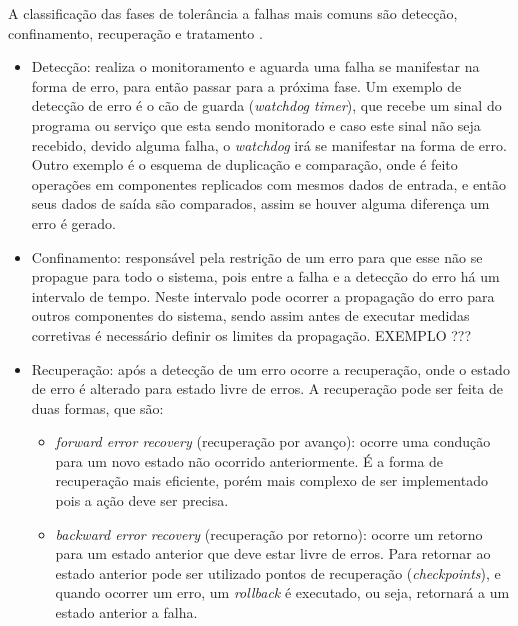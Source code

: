 A classificação das fases de tolerância a falhas mais comuns são detecção, confinamento, recuperação e tratamento \cite{weber2002}.


\begin{itemize}
 \item Detecção: realiza o monitoramento e aguarda uma falha se manifestar na forma de erro, para então passar para a próxima fase. 
 Um exemplo de detecção de erro é o cão de guarda (\textit{watchdog timer}), que recebe um sinal do programa ou serviço que esta sendo 
 monitorado e caso este sinal não seja recebido, devido alguma falha, o \textit{watchdog} irá se manifestar na forma de erro. 
 Outro exemplo é o esquema de duplicação e comparação, onde é feito operações em componentes replicados com mesmos dados de entrada, e então
 seus dados de saída são comparados, assim se houver alguma diferença um erro é gerado.
 \item Confinamento: responsável pela restrição de um erro para que esse não se propague para todo o sistema, pois entre a falha e a
 detecção do erro há um intervalo de tempo. Neste intervalo pode ocorrer a propagação do erro para outros componentes do sistema, sendo assim 
 antes de executar medidas corretivas é necessário definir os limites da propagação. EXEMPLO ???
 \item Recuperação: após a detecção de um erro ocorre a recuperação, onde o estado de erro é alterado para estado livre de erros. A recuperação
 pode ser feita de duas formas, que são:
 \begin{itemize}
  \item \textit{forward error recovery} (recuperação por avanço): ocorre uma condução para um novo estado não ocorrido anteriormente. É a forma
  de recuperação mais eficiente, porém mais complexo de ser implementado pois a ação deve ser precisa.
  \item \textit{backward error recovery} (recuperação por retorno): ocorre um retorno para um estado anterior que deve estar livre de erros.
  Para retornar ao estado anterior pode ser utilizado pontos de recuperação (\textit{checkpoints}), e quando ocorrer um erro, um \textit{rollback} 
  é executado, ou seja, retornará a um estado anterior a falha.

\end{itemize}
\end{itemize}
